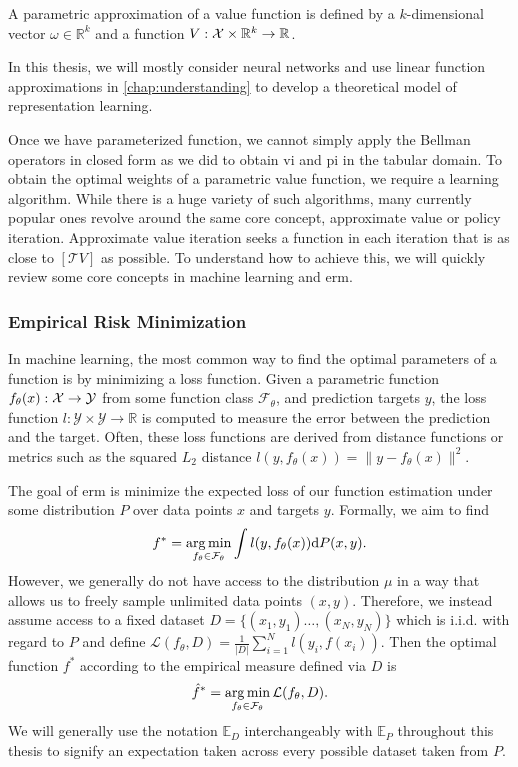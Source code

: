 \begin{definition}
    A parametric approximation of a value function is defined by a $k$-dimensional vector $\omega \in \mathbb{R}^k$ and a function $V: \mathcal{X} \times \mathbb{R}^k \rightarrow \mathbb{R}$.
\end{definition}

In this thesis, we will mostly consider neural networks and use linear function approximations in \autoref{chap:understanding} to develop a theoretical model of representation learning.

Once we have parameterized function, we cannot simply apply the Bellman operators in closed form as we did to obtain \ac{vi} and \ac{pi} in the tabular domain.
To obtain the optimal weights of a parametric value function, we require a learning algorithm.
While there is a huge variety of such algorithms, many currently popular ones revolve around the same core concept, approximate value or policy iteration.
Approximate value iteration seeks a function in each iteration that is as close to $[\mathcal{T}V]$ as possible.
To understand how to achieve this, we will quickly review some core concepts in machine learning and \ac{erm}.

\subsubsection{Empirical Risk Minimization}

In machine learning, the most common way to find the optimal parameters of a function is by minimizing a loss function.
Given a parametric function $f_\theta(x): \mathcal{X} \rightarrow \mathcal{Y}$ from some function class $\mathcal{F}_\theta$, and prediction targets $y$, the loss function $l: \mathcal{Y} \times \mathcal{Y} \rightarrow \mathbb{R}$ is computed to measure the error between the prediction and the target.
Often, these loss functions are derived from distance functions or metrics such as the squared $L_2$ distance $l(y, f_\theta(x)) = \|y - f_\theta(x)\|^2.$

The goal of \ac{erm} is minimize the expected loss of our function estimation under some distribution $P$ over data points $x$ and targets $y$.
Formally, we aim to find $$f^* = \operatorname*{arg\,min}_{f_\theta\in\mathcal{F}_\theta} \int l(y, f_\theta(x)) \mathrm{d} P(x,y).$$
However, we generally do not have access to the distribution $\mu$ in a way that allows us to freely sample unlimited data points $(x,y)$.
Therefore, we instead assume access to a fixed dataset $D = \{(x_1, y_1) \dots, (x_N, y_N)\}$ which is i.i.d. with regard to $P$ and define $\mathcal{L}(f_\theta,D) = \frac{1}{|D|} \sum_{i=1}^N l(y_i, f(x_i))$.
Then the optimal function $f^*$ according to the empirical measure defined via $D$ is $$\hat{f}^* = \operatorname*{arg\,min}_{f_\theta \in \mathcal{F}_\theta} \mathcal{L}(f_\theta,D).$$
We will generally use the notation $\mathbb{E}_D$ interchangeably with $\mathbb{E}_P$ throughout this thesis to signify an expectation taken across every possible dataset taken from $P$.

